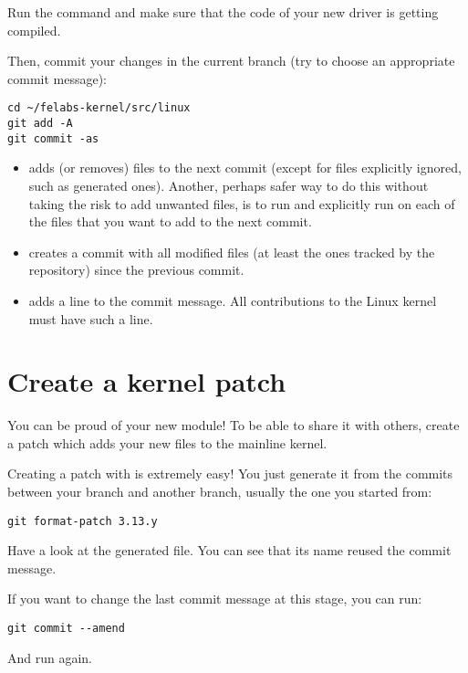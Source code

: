 Run the  command and make sure that the code of your new
driver is getting compiled. 

Then, commit your changes in the current branch (try to choose an
appropriate commit message):

\begin{verbatim}
cd ~/felabs-kernel/src/linux
git add -A
git commit -as
\end{verbatim}

\begin{itemize}
\item {} adds (or removes) files to the next commit
      (except for files explicitly ignored, such as generated ones).
      Another, perhaps safer way to do this without taking the risk
      to add unwanted files, is to run  and explicitly
      run  on each of the files that you want to 
      add to the next commit.
\item {} creates a commit with all modified files
      (at least the ones tracked by the repository) since the previous
      commit.
\item {} adds a  line to the
      commit message. All contributions to the Linux kernel must have
      such a line.
\end{itemize}

\section{Create a kernel patch}

You can be proud of your new module! To be able to share it with
others, create a patch which adds your new files to the mainline
kernel.

Creating a patch with  is extremely easy! You just generate it
from the commits between your branch and another branch, usually the
one you started from:

\begin{verbatim}
git format-patch 3.13.y
\end{verbatim}

Have a look at the generated file. You can see that its name reused
the commit message.

If you want to change the last commit message at this stage, you 
can run:

\begin{verbatim}
git commit --amend
\end{verbatim}

And run  again.
